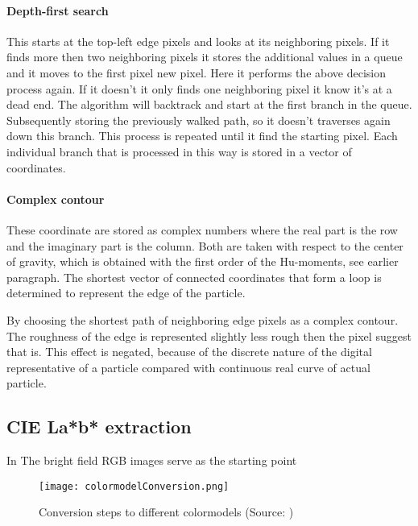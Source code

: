 \documentclass[11pt,fleqn,,a4paper,twoside,openright]{book}
\begin{document}
\paragraph{Depth-first search}\label{Depth-first search}
This starts at the top-left edge pixels and looks at its neighboring pixels. If it finds more then two neighboring pixels it stores the additional values in a queue and it moves to the first pixel new pixel. Here it performs the above decision process again. If it doesn't it only finds one neighboring pixel it know it's at a dead end. The algorithm will backtrack and start at the first branch in the queue. Subsequently storing the previously walked path, so it doesn't traverses again down this branch. This process is repeated until it find the starting pixel. Each individual branch that is processed in this way is stored in a vector of coordinates.

\paragraph{Complex contour}\label{Complex contour}
These coordinate are stored as complex numbers where the real part is the row and the imaginary part is the column. Both are taken with respect to the center of gravity, which is obtained with the first order of the Hu-moments, see earlier paragraph.
The shortest vector of connected coordinates that form a loop is determined to represent the edge of the particle. 

\begin{remark}
	By choosing the shortest path of neighboring edge pixels as a complex contour. The roughness of the edge is represented slightly less rough then the pixel suggest that is. This effect is negated, because of the discrete nature of the digital representative of a particle compared with continuous real curve of actual particle.	
\end{remark}

\subsection{CIE La*b* extraction}\label{CIELab}
In 
The bright field RGB images serve as the starting point 
\begin{figure}[h]
	\centering
	\texttt{[image: colormodelConversion.png]}
	\caption{Conversion steps to different colormodels (Source: \cite{viscarra_rossel_using_2008})}
\end{figure}
\end{document}
